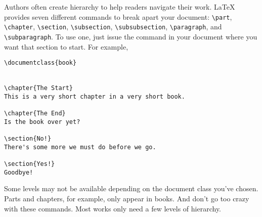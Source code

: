 Authors often create hierarchy to help readers navigate their work.
\LaTeX{} provides seven different commands to break apart your document:
\verb|\part|, \verb|\chapter|, \verb|\section|, \verb|\subsection|,
\verb|\subsubsection|, \verb|\paragraph|, and \verb|\subparagraph|.
To use one, just issue the command in your document where you want that section
to start.
For example,
\begin{leftfigure}
\begin{lstlisting}
\documentclass{book}


\chapter{The Start}
This is a very short chapter in a very short book.

\chapter{The End}
Is the book over yet?

\section{No!}
There's some more we must do before we go.

\section{Yes!}
Goodbye!

\end{lstlisting}
\end{leftfigure}
Some levels may not be available depending on the document class
you've chosen. Parts and chapters, for example, only appear in books.
And don't go too crazy with these commands.
Most works only need a few levels of hierarchy.

